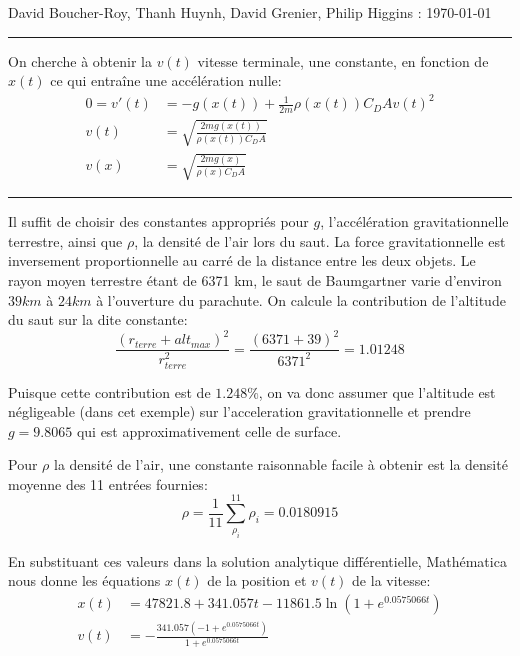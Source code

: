 \documentclass[12pt]{article}
\begin{document}


\medskip
{} David Boucher-Roy, Thanh Huynh, David Grenier, Philip Higgins
 : \today

\bigskip


\bigskip

\hrule height0.3pt

\bigskip



\noindent
On cherche \`a obtenir la $v(t)$ vitesse terminale, une constante, en fonction de $x(t)$ ce qui entra\^ine une acc\'el\'eration nulle:
\begin{align*}
    0 = v'(t) &= -g(x(t)) + \frac1{2m}\rho(x(t)) C_D A v(t)^2\\
    v(t) &= \sqrt{\frac{2mg(x(t))}{\rho(x(t)) C_D A}}\\
    v(x) &= \sqrt{\frac{2mg(x)}{\rho(x) C_D A}}
\end{align*}

\bigskip

\hrule height0.3pt

\bigskip


\noindent
Il suffit de choisir des constantes appropri\'es pour $g$, l'acc\'el\'eration gravitationnelle terrestre, ainsi que $\rho$, la densit\'e de l'air lors du saut.
La force gravitationnelle est inversement proportionnelle au carr\'e de la distance entre les deux objets.
Le rayon moyen terrestre \'etant de 6371 km, le saut de Baumgartner varie d'environ $39km$ \`a $24km$ \`a l'ouverture du parachute. On calcule la contribution de l'altitude du saut sur la dite constante:
\[ \frac{(r_{terre} + alt_{max})^2}{r_{terre}^2} = \frac{(6371 + 39)^2}{6371^2} = 1.01248 \]

Puisque cette contribution est de $1.248\%$, on va donc assumer que l'altitude est n\'egligeable (dans cet exemple) sur l'acceleration gravitationnelle et prendre $g = 9.8065$ qui est approximativement celle de surface.

Pour $\rho$ la densit\'e de l'air, une constante raisonnable facile \`a obtenir est la densit\'e moyenne des 11 entr\'ees fournies:
\[ \rho = \frac1{11}\sum_{\rho_i}^{11} \rho_i = 0.0180915 \]

En substituant ces valeurs dans la solution analytique diff\'erentielle, Math\'ematica nous donne les \'equations $x(t)$ de la position et $v(t)$ de la vitesse:
\begin{align*}
    x(t) &= 47821.8 + 341.057 t - 11861.5 \ln(1 + e^{0.0575066t})\\
    v(t) &= -\frac{341.057(-1 + e^{0.0575066t})}{1 + e^{0.0575066t}}
\end{align*}
\end{document}
